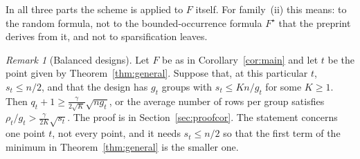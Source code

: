 \documentclass[11pt,a4paper]{article}
\theoremstyle{definition}
\theoremstyle{remark}
\newtheorem{remark}[theorem]{Remark}
\begin{document}
In all three parts the scheme is applied to $F$ itself. For family~(ii) this means: to the
random formula, not to the bounded-occurrence formula $F^\star$ that the preprint derives
from it, and not to sparsification leaves.

\begin{remark}[Balanced designs]\label{rem:balanced}
Let $F$ be as in Corollary~\ref{cor:main} and let $t$ be the point given by
Theorem~\ref{thm:general}. Suppose that, at this particular $t$, $s_t\le n/2$, and that the
design has $g_t$ groups with $s_t\le Kn/g_t$ for some $K\ge1$. Then
$q_t+1\ge\frac{\gamma}{2\sqrt K}\sqrt{ng_t}$, or the average number of rows per group
satisfies $\rho_t/g_t>\frac{\gamma}{2K}\sqrt{s_t}$. The proof is in
Section~\ref{sec:proofcor}. The statement concerns one point $t$, not every point, and it
needs $s_t\le n/2$ so that the first term of the minimum in Theorem~\ref{thm:general} is the
smaller one.
\end{remark}
\end{document}
